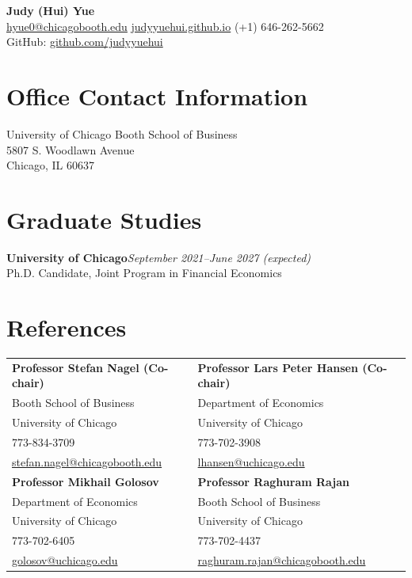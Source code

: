 \documentclass[11pt,letterpaper]{article}
\newenvironment{sectionbody}{%
  \begin{list}{}{\setlength{\leftmargin}{0.18in}\setlength{\rightmargin}{0pt}%
    \setlength{\topsep}{0pt}\setlength{\partopsep}{0pt}%
    \setlength{\parsep}{3pt}\setlength{\itemsep}{0pt}}\item[]%
}{\end{list}}
\newcommand{\education}[3]{%
  \textbf{#1}\hfill\textit{#2}\\#3\par
}
\begin{document}
\begin{center}
  {\LARGE\bfseries Judy (Hui) Yue}\\[7pt]
  \href{mailto:hyue0@chicagobooth.edu}{hyue0@chicagobooth.edu}
  \enspace\textbullet\enspace
  \href{https://judyyuehui.github.io/}{judyyuehui.github.io}
  \enspace\textbullet\enspace
  (+1) 646-262-5662\\[3pt]
  {\small GitHub: \href{https://github.com/judyyuehui}{github.com/judyyuehui}}
\end{center}
\vspace{-5pt}

\section*{Office Contact Information}
\begin{sectionbody}
  University of Chicago Booth School of Business\\
  5807 S. Woodlawn Avenue\\
  Chicago, IL 60637
\end{sectionbody}

\section*{Graduate Studies}
\begin{sectionbody}
  \education{University of Chicago}{September 2021--June 2027 (expected)}{%
    Ph.D. Candidate, Joint Program in Financial Economics}
\end{sectionbody}

\section*{References}
\begin{sectionbody}
  \begin{tabularx}{\linewidth}{@{}X@{\hspace{0.25in}}X@{}}
    \textbf{Professor Stefan Nagel (Co-chair)} &
      \textbf{Professor Lars Peter Hansen (Co-chair)}\\
    Booth School of Business & Department of Economics\\
    University of Chicago & University of Chicago\\
    773-834-3709 & 773-702-3908\\
    \href{mailto:stefan.nagel@chicagobooth.edu}{stefan.nagel@chicagobooth.edu} &
      \href{mailto:lhansen@uchicago.edu}{lhansen@uchicago.edu}\\[9pt]
    \textbf{Professor Mikhail Golosov} & \textbf{Professor Raghuram Rajan}\\
    Department of Economics & Booth School of Business\\
    University of Chicago & University of Chicago\\
    773-702-6405 & 773-702-4437\\
    \href{mailto:golosov@uchicago.edu}{golosov@uchicago.edu} &
      \href{mailto:raghuram.rajan@chicagobooth.edu}{raghuram.rajan@chicagobooth.edu}
  \end{tabularx}
\end{sectionbody}
\end{document}
